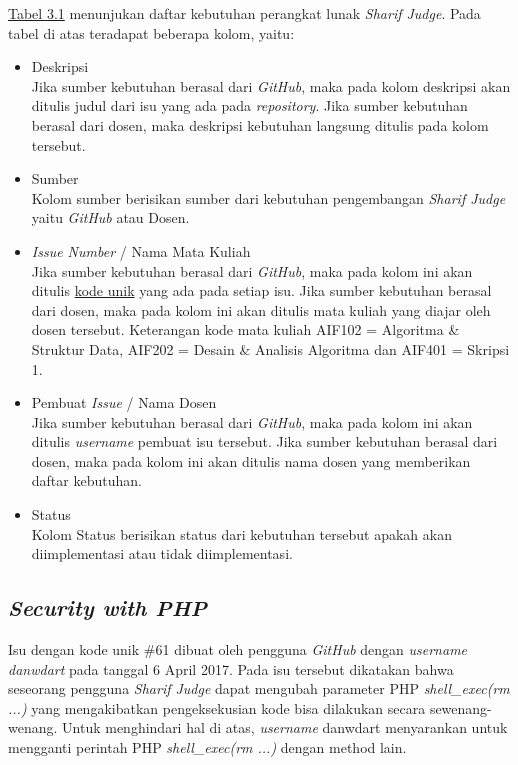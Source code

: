 \hyperref[tab:kebutuhan]{Tabel 3.1} menunjukan daftar kebutuhan perangkat lunak \textit{Sharif Judge}. Pada tabel di atas teradapat beberapa kolom, yaitu:
\begin{itemize}
	\item Deskripsi \\
	Jika sumber kebutuhan berasal dari \textit{GitHub}, maka pada kolom deskripsi akan ditulis judul dari isu yang ada pada \textit{repository}. Jika sumber kebutuhan berasal dari dosen, maka deskripsi kebutuhan langsung ditulis pada kolom tersebut.
	\item Sumber \\
	Kolom sumber berisikan sumber dari kebutuhan pengembangan \textit{Sharif Judge} yaitu \textit{GitHub} atau Dosen.
	\item \textit{Issue Number} / Nama Mata Kuliah \\
	Jika sumber kebutuhan berasal dari \textit{GitHub}, maka pada kolom ini akan ditulis \hyperref[sec:analisis]{kode unik} yang ada pada setiap isu. Jika sumber kebutuhan berasal dari dosen, maka pada kolom ini akan ditulis mata kuliah yang diajar oleh dosen tersebut. Keterangan kode mata kuliah AIF102 = Algoritma \& Struktur Data, AIF202 = Desain \& Analisis Algoritma dan AIF401 = Skripsi 1.
	\item Pembuat \textit{Issue} / Nama Dosen \\
	Jika sumber kebutuhan berasal dari \textit{GitHub}, maka pada kolom ini akan ditulis \textit{username} pembuat isu tersebut. Jika sumber kebutuhan berasal dari dosen, maka pada kolom ini akan ditulis nama dosen yang memberikan daftar kebutuhan.
	\item Status \\
	Kolom Status berisikan status dari kebutuhan tersebut apakah akan diimplementasi atau tidak diimplementasi.
\end{itemize}


\subsection{\textit{Security with PHP}}
Isu dengan kode unik \#61 dibuat oleh pengguna \textit{GitHub} dengan \textit{username} \textit{danwdart} pada tanggal 6 April 2017. Pada isu tersebut dikatakan bahwa seseorang pengguna \textit{Sharif Judge} dapat mengubah parameter PHP \textit{shell\_exec(rm ...)} yang mengakibatkan pengeksekusian kode bisa dilakukan secara sewenang-wenang. Untuk menghindari hal di atas, \textit{username} danwdart menyarankan untuk mengganti perintah PHP \textit{shell\_exec(rm ...)} dengan method lain.

